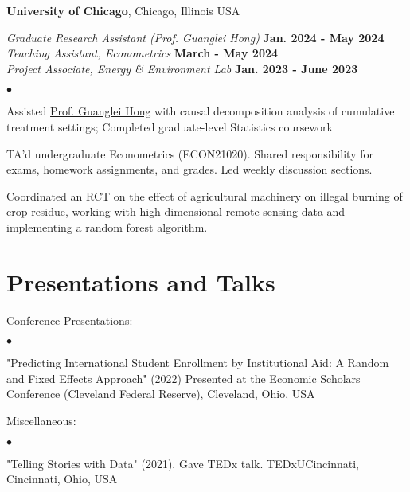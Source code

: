 \documentclass[margin,line]{res}
\newenvironment{list2}{
  \begin{list}{$\bullet$}{%
      \setlength{\itemsep}{0in}
      \setlength{\parsep}{0in} \setlength{\parskip}{0in}
      \setlength{\topsep}{0in} \setlength{\partopsep}{0in} 
      \setlength{\leftmargin}{0.2in}}}{\end{list}}
\begin{document}
\begin{resume}
{\bf University of Chicago}, Chicago, Illinois USA

\vspace{-.3cm}
{\em Graduate Research Assistant (Prof. Guanglei Hong)} \hfill {\bf Jan. 2024 - May 2024}\\
{\em Teaching Assistant, Econometrics} \hfill {\bf March - May 2024}\\
{\em Project Associate, Energy \& Environment Lab} \hfill {\bf Jan. 2023 - June 2023}\\

\begin{list2}
\item Assisted \href{https://voices.uchicago.edu/ghong/}{Prof. Guanglei Hong} with causal decomposition analysis of cumulative treatment settings; Completed graduate-level Statistics coursework
\item TA'd undergraduate Econometrics (ECON21020). Shared responsibility for exams, homework assignments, and grades. Led weekly discussion sections.  
\item Coordinated an RCT on the effect of agricultural machinery on illegal burning of crop residue, working with high-dimensional remote sensing data and implementing a random forest algorithm.  
\end{list2}



\section{\sc Presentations and Talks}
Conference Presentations:
\begin{list2}
\item "Predicting International Student Enrollment by Institutional Aid: A Random and Fixed Effects Approach" (2022) Presented at the Economic Scholars Conference (Cleveland Federal Reserve), Cleveland, Ohio, USA
\end{list2}

Miscellaneous:
\begin{list2}
\item "Telling Stories with Data" (2021). Gave TEDx talk. TEDxUCincinnati, Cincinnati, Ohio, USA 
\end{list2}


\end{resume}
\end{document}
